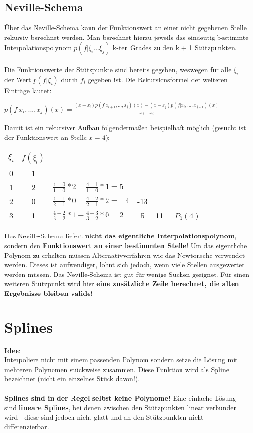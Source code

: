\documentclass[10pt,a4paper]{article}
\begin{document}
	\subsection{Neville-Schema}
	Über das Neville-Schema kann der Funktionswert an einer nicht gegebenen Stelle rekursiv berechnet werden. Man berechnet hierzu jeweils das eindeutig bestimmte Interpolationspolynom $p(f|\xi_i ... \xi_j)$ k-ten Grades zu den k + 1 Stützpunkten.\\\\ Die Funktionswerte der Stützpunkte sind bereits gegeben, weswegen für alle $\xi_i$ der Wert $p(f|\xi_i)$ durch $f_i$ gegeben ist. Die Rekursionsformel der weiteren Einträge lautet:
	\begin{center}
		$p(f|x_i,...,x_j)(x) = \frac{(x - x_i) p(f|x_{i + 1},...,x_j)(x) - (x - x_j)p(f|x_i,...,x_{j-1})(x)}{x_j - x_i}$
	\end{center}
	Damit ist ein rekursiver Aufbau folgendermaßen beispielhaft möglich (gesucht ist der Funktionswert an Stelle $x = 4$):\\
	\begin{center}
		\begin{tabular}{c | c l c c}
			$\xi_i$ & $f(\xi_i)$ & & &\\
			\hline
			0 & 1 & &\\
			1 & 2 & $\frac{4 - 0}{1 - 0} * 2 - \frac{4 - 1}{1 - 0} * 1 = 5$ & &\\
			2 & 0 & $\frac{4 - 1}{2 - 1} * 0 - \frac{4 - 2}{2 - 1} * 2 = -4$ & -13 &\\
			3 & 1 & $\frac{4 - 2}{3 - 2} * 1 - \frac{4 - 3}{3 - 2} * 0 = 2$ & 5 & 11 = $P_3(4)$
		\end{tabular}
	\end{center}
	Das Neville-Schema liefert \textbf{nicht das eigentliche Interpolationspolynom}, sondern den \textbf{Funktionswert an einer bestimmten Stelle}! Um das eigentliche Polynom zu erhalten müssen Alternativverfahren wie das Newtonsche verwendet werden. Dieses ist aufwendiger, lohnt sich jedoch, wenn viele Stellen ausgewertet werden müssen. Das Neville-Schema ist gut für wenige Suchen geeignet. Für einen weiteren Stützpunkt wird hier \textbf{eine zusätzliche Zeile berechnet, die alten Ergebnisse bleiben valide!}
	\newpage
	\section{Splines}
	\textbf{Idee}:\\Interpoliere nicht mit einem passenden Polynom sondern setze die Lösung mit mehreren Polynomen stückweise zusammen. Diese Funktion wird als Spline bezeichnet (nicht ein einzelnes Stück davon!).\\\\\textbf{Splines sind in der Regel selbst keine Polynome!} Eine einfache Lösung sind \textbf{lineare Splines}, bei denen zwischen den Stützpunkten linear verbunden wird - diese sind jedoch nicht glatt und an den Stützpunkten nicht differenzierbar.
	
\end{document}
